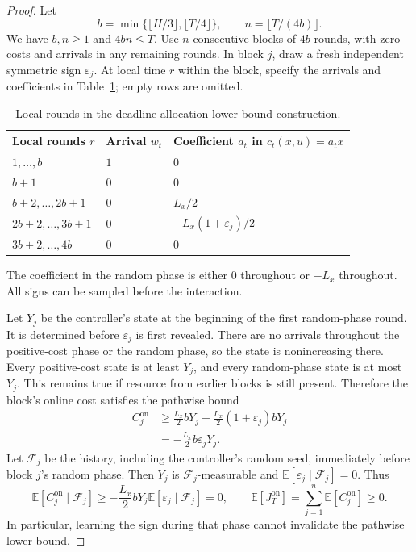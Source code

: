 \documentclass[11pt]{article}
\newcommand{\E}{\mathbb{E}}
\theoremstyle{plain}
\theoremstyle{remark}
\numberwithin{equation}{section}
\begin{document}
\begin{proof}
Let
\begin{equation}\label{ch6:eq:block-parameters}
 b=\min\{\lfloor H/3\rfloor,\lfloor T/4\rfloor\},\qquad
 n=\lfloor T/(4b)\rfloor.
\end{equation}
We have $b,n\ge1$ and $4bn\le T$.  Use $n$ consecutive blocks of $4b$ rounds, with zero
costs and arrivals in any remaining rounds. In block $j$, draw a fresh
independent symmetric sign $\varepsilon_j$. At local time $r$ within the
block, specify the arrivals and coefficients in Table~\ref{tab:deadline-block-phases};
empty rows are omitted.
\begin{table}[tbp]
\centering
\caption{Local rounds in the deadline-allocation lower-bound construction.}
\label{tab:deadline-block-phases}
\begin{tabular}{@{}lll@{}}
\toprule
Local rounds $r$ & Arrival $w_t$ & Coefficient $a_t$ in $c_t(x,u)=a_tx$\\
\midrule
$1,\ldots,b$ & $1$ & $0$\\
$b+1$ & $0$ & $0$\\
$b+2,\ldots,2b+1$ & $0$ & $L_x/2$\\
$2b+2,\ldots,3b+1$ & $0$ & $-L_x(1+\varepsilon_j)/2$\\
$3b+2,\ldots,4b$ & $0$ & $0$\\
\bottomrule
\end{tabular}
\end{table}
The coefficient in the random phase is either $0$ throughout or $-L_x$
throughout. All signs can be sampled before the interaction.

Let $Y_j$ be the controller's state at the beginning of the first random-phase
round. It is determined before $\varepsilon_j$ is first revealed.
There are no arrivals throughout the positive-cost phase or the random
phase, so the state is nonincreasing there. Every positive-cost state is
at least $Y_j$, and every random-phase state is at most $Y_j$.
This remains true if resource from earlier blocks is still present.
Therefore the block's online cost satisfies the pathwise bound
\begin{align}
 C_j^{\mathrm{on}}
 &\ge\frac{L_x}{2}bY_j
 -\frac{L_x}{2}(1+\varepsilon_j)bY_j\nonumber\\
 &=-\frac{L_x}{2}b\varepsilon_jY_j.
 \label{ch6:eq:block-online}
\end{align}
Let $\mathcal F_j$ be the history, including the controller's random seed,
immediately before block $j$'s random phase.  Then $Y_j$ is
$\mathcal F_j$-measurable and
$\E[\varepsilon_j\mid\mathcal F_j]=0$.  Thus
\[
\E[C_j^{\mathrm{on}}\mid\mathcal F_j]
\ge-\frac{L_x}{2}bY_j\E[\varepsilon_j\mid\mathcal F_j]=0,
\qquad
\E[J_T^{\mathrm{on}}]=\sum_{j=1}^{n}\E[C_j^{\mathrm{on}}]\ge0.
\]
In particular, learning the sign during that phase cannot invalidate the
pathwise lower bound.


\end{proof}
\end{document}
